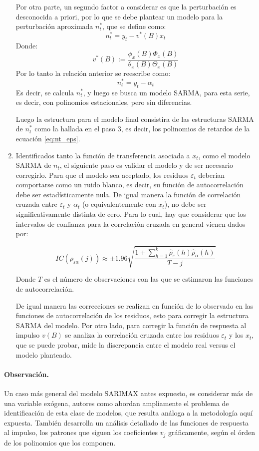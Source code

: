 \documentclass[12pt,oneside]{book}\usepackage[]{graphicx}\usepackage[]{color}
\theoremstyle{definition} %
\begin{document}
\begin{enumerate}
Por otra parte, un segundo factor a considerar es que la perturbación es desconocida a priori, por lo que se debe plantear un modelo para la perturbación aproximada $n_t^{*}$, que se define como:
$$n_t^{*} = y_t - v^{*}(B)x_t$$
Donde:
$$v^{*}(B):=\frac{ \phi_x(B) \Phi_x(B) }{\theta_x(B) \Theta_x(B)}$$
Por lo tanto la relación anterior se reescribe como:
$$n_t^{*} = y_t -\alpha_t$$
Es decir, se calcula $n_t^{*}$, y luego se busca un modelo SARMA, para esta serie, es decir, con polinomios estacionales, pero sin diferencias. 

Luego la estructura para el modelo final consistira de las estructuras SARMA de $n_t^{*}$ como la hallada en el paso 3, es decir, los polinomios de retardos de la ecuación \ref{eq:nt_eps}.

\item Identificados tanto la función de transferencia asociada a $x_t$, como el modelo SARMA de $n_t$, el siguiente paso es validar el modelo y de ser necesario corregirlo. Para que el modelo sea aceptado, los residuos $\varepsilon_t$ deberían comportarse como un ruido blanco, es decir, su función de autocorrelación debe ser estadísticamente nula. De igual manera la función de correlación cruzada entre $\varepsilon_t$ y $\alpha_t$ (o equivalentemente con $x_t$), no debe ser significativamente distinta de cero. Para lo cual, hay que considerar que los intervalos de confianza para la correlación cruzada en general vienen dados por:

$$IC(\rho_{\varepsilon\alpha}(j) ) \approx \pm 1.96 \sqrt{ \frac{1+\sum_{h=1}^k \hat\rho_\varepsilon(h) \hat\rho_\alpha(h) }{T-j} } $$

Donde $T$ es el número de observaciones con las que se estimaron las funciones de autocorrelación.

De igual manera las correcciones se realizan en función de lo observado en las funciones de autocorrelación de los residuos, esto para corregir la estructura SARMA del modelo. Por otro lado, para corregir la función de respuesta al impulso $v(B)$ se analiza la correlación cruzada entre los residuos $\varepsilon_t$ y los $x_t$, que se puede probar, mide la discrepancia entre el modelo real versus el modelo planteado.

\end{enumerate}


\paragraph{Observación.} Un caso más general del modelo SARIMAX antes expuesto, es considerar más de una variable exógena, autores como \citeauthor{pankratz2012forecasting} \citeyear{pankratz2012forecasting} abordan ampliamente el problema de identificación de esta clase de modelos, que resulta análoga a la metodología aquí expuesta. También desarrolla un análisis detallado de las funciones de respuesta al impulso, los patrones que siguen los coeficientes $v_j$ gráficamente, según el órden de los polinomios que los componen.
\end{document}
